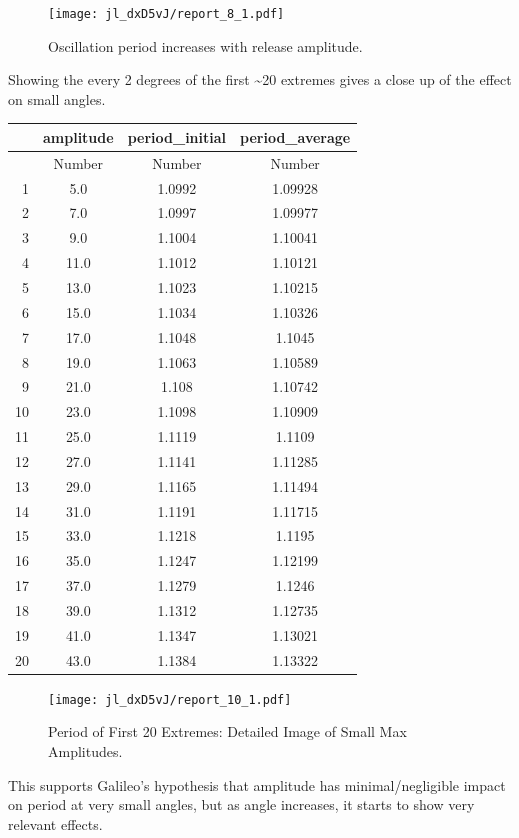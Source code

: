 \documentclass[12pt,a4paper]{article}
\begin{document}
\begin{figure}[!h]
\center
\texttt{[image: jl\_dxD5vJ/report\_8\_1.pdf]}
\caption{Oscillation period increases with release amplitude.}
\end{figure}

Showing the every 2 degrees of the first {\textasciitilde}20 extremes gives a close up of the effect on small angles.



\begin{tabular}{r|ccc}
	& amplitude & period\_initial & period\_average\\
	\hline
	& Number & Number & Number\\
	\hline
	1 & 5.0 & 1.0992 & 1.09928 \\
	2 & 7.0 & 1.0997 & 1.09977 \\
	3 & 9.0 & 1.1004 & 1.10041 \\
	4 & 11.0 & 1.1012 & 1.10121 \\
	5 & 13.0 & 1.1023 & 1.10215 \\
	6 & 15.0 & 1.1034 & 1.10326 \\
	7 & 17.0 & 1.1048 & 1.1045 \\
	8 & 19.0 & 1.1063 & 1.10589 \\
	9 & 21.0 & 1.108 & 1.10742 \\
	10 & 23.0 & 1.1098 & 1.10909 \\
	11 & 25.0 & 1.1119 & 1.1109 \\
	12 & 27.0 & 1.1141 & 1.11285 \\
	13 & 29.0 & 1.1165 & 1.11494 \\
	14 & 31.0 & 1.1191 & 1.11715 \\
	15 & 33.0 & 1.1218 & 1.1195 \\
	16 & 35.0 & 1.1247 & 1.12199 \\
	17 & 37.0 & 1.1279 & 1.1246 \\
	18 & 39.0 & 1.1312 & 1.12735 \\
	19 & 41.0 & 1.1347 & 1.13021 \\
	20 & 43.0 & 1.1384 & 1.13322 \\
\end{tabular}


\begin{figure}[!h]
\center
\texttt{[image: jl\_dxD5vJ/report\_10\_1.pdf]}
\caption{Period of First 20 Extremes: Detailed Image of Small Max Amplitudes.}
\end{figure}

This supports Galileo's hypothesis that amplitude has minimal/negligible impact on period at very small angles, but as angle increases, it starts to show very relevant effects.
\end{document}
